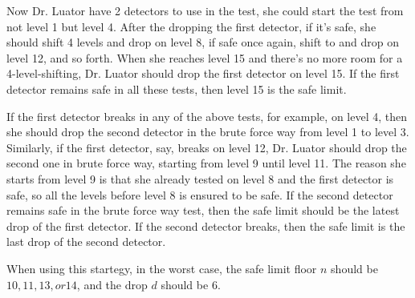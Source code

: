 \documentclass[11pt]{article}
\begin{document}
Now Dr. Luator have 2 detectors to use in the test, she could start the test from not level 1
but level 4. After the dropping the first detector, if it's safe, she should shift 4 levels and 
drop on level 8, if safe once again, shift to and drop on level 12, and so forth.
When she reaches level 15 and there's no more room for a 4-level-shifting,
Dr. Luator should drop the first detector on level 15. If the first detector remains safe in all
these tests, then level 15 is the safe limit.

If the first detector breaks in any of the above tests, for example, on level 4,
then she should drop the second detector in the brute force way from level 1 to level 3.
Similarly, if the first detector, say, breaks on level 12, Dr. Luator should drop the second one
in brute force way, starting from level 9 until level 11. The reason she starts from level 9 is
that she already tested on level 8 and the first detector is safe, so all the levels before level 8
is ensured to be safe. If the second detector remains safe in the brute force way test,
then the safe limit should be the latest drop of the first detector.
If the second detector breaks, then the safe limit is the last drop of the second detector.

When using this startegy, in the worst case, the safe
limit floor $n$ should be $10, 11, 13, or 14$, and the drop $d$ should be $6$.

\end{document}
